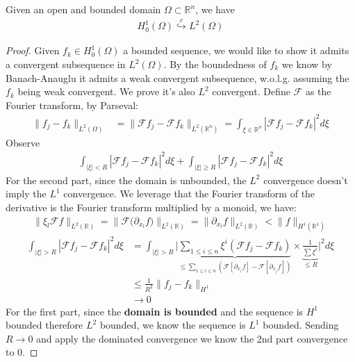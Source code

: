 \begin{theorem}
Given an open and bounded domain $\Omega \subset \mathbb{R}^n$, we have 
\begin{align*}
	H_0^1(\Omega) \overset{c}{\hookrightarrow} L^2(\Omega)
\end{align*}
	
\begin{proof}
	Given $f_k \in H_0^1(\Omega)$ a bounded sequence, we would like to show it admits a convergent subsequence in $L^2(\Omega)$. By the boundedness of $f_k$ we know by Banach-Anauglu it admits a weak convergent subsequence, w.o.l.g. assuming the $f_k$ being weak convergent. We prove it's also $L^2$ convergent. Define $\mathcal{F}$ as the Fourier transform, by Parseval:
	\begin{align*}
		\|f_j - f_k\|_{L^2(\Omega)} &= \|\mathcal{F}f_j - \mathcal{F}f_k\|_{L^2(\mathbb{R}^n)}
		= \int_{\xi \in \mathbb{R}^n} |\mathcal{F}f_j - \mathcal{F} f_k|^2 d\xi
	\end{align*}
	Observe
	\begin{align*}
		\int_{|\xi| < R} |\mathcal{F}f_j - \mathcal{F} f_k|^2 d\xi + \int_{|\xi| \ge R} |\mathcal{F}f_j - \mathcal{F} f_k|^2 d\xi
	\end{align*}
	For the second part, since the domain is unbounded, the $L^2$ convergence doesn't imply the $L^1$ convergence. We leverage that the Fourier transform of the derivative is the Fourier transform multiplied by a monoid, we have:
	\begin{align*}
		\|\xi_l \mathcal{F} f\|_{L^2(\mathbb{R})} = \bigg\|\mathcal{F} \bigg(\partial_{x_l} f\bigg)\bigg\|_{L^2(\mathbb{R})} = \|\partial_{x_l} f\|_{L^2(\mathbb{R})} < \|f\|_{H^1(\mathbb{R}^1)}
	\end{align*}
	\begin{align*}
		\int_{|\xi| > R} |\mathcal{F}f_j - \mathcal{F}f_k|^2 d\xi 
		& = \int_{|\xi| >R} \bigg| \underbrace{ \sum_{1 \le i \le n} \xi^i (\mathcal{F}f_j - \mathcal{F} f_k)}_{ \le \sum_{ 1 \le i \le n } (\mathcal{F} [\partial_{x_i} f] - \mathcal{F}[\partial_{x_j} f])  }  \times \underbrace{ \frac{1}{\sum \xi^i}}_{\le R} \bigg|^2 d\xi \\
		&\le  \frac{1}{R^2} \|f_j - f_k\|_{H^1} \\
		&\rightarrow 0
	\end{align*}
	For the first part, since the \textbf{domain is bounded} and the sequence is $H^1$ bounded therefore $L^2$ bounded, we know the sequence is $L^1$ bounded. Sending $R \rightarrow 0$ and apply the dominated convergence we know the 2nd part convergence to 0.
\end{proof}
\end{theorem}

